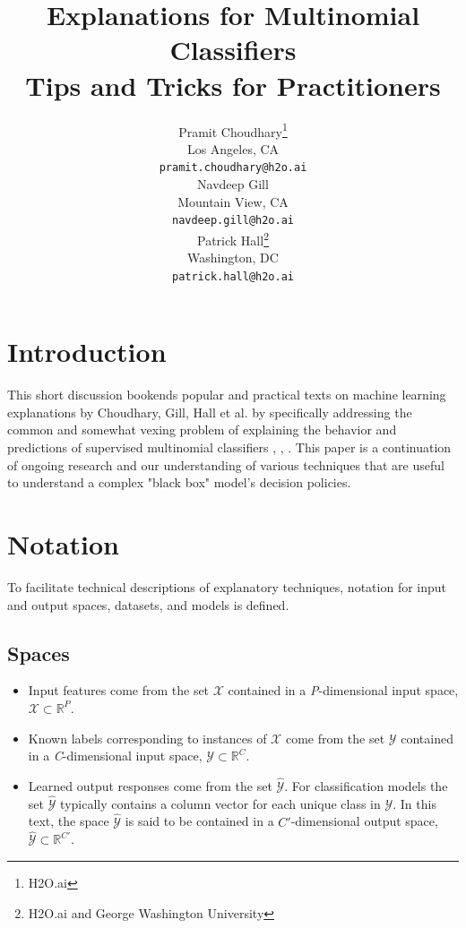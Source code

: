 \documentclass{article}
\title{Explanations for Multinomial Classifiers\\\vspace{10pt}\small{Tips and Tricks for Practitioners}}
\author{
  Pramit Choudhary\thanks{H2O.ai}\\
  Los Angeles, CA\\
  \texttt{pramit.choudhary@h2o.ai}\\
  \And
  Navdeep Gill\samethanks\\
  Mountain View, CA\\
  \texttt{navdeep.gill@h2o.ai}\\ 
  \And
  Patrick Hall\thanks{H2O.ai and George Washington University}\\
  Washington, DC\\
  \texttt{patrick.hall@h2o.ai}}
\begin{document}
\maketitle

\begin{abstract}


\end{abstract}

\section{Introduction}

This short discussion bookends popular and practical texts on machine learning explanations by Choudhary, Gill, Hall et al. by specifically addressing the common and somewhat vexing problem of explaining the behavior and predictions of supervised multinomial classifiers \cite{oreillymli}, \cite{art_and_sci}, \cite{oreillyskater} \cite{sarkar2018practical}. This paper is a continuation of ongoing research and our understanding of various techniques that are useful to understand a complex "black box" model's decision policies.


\section{Notation} \label{sec:notation}

To facilitate technical descriptions of explanatory techniques, notation for input and output spaces, datasets, and models is defined.

\subsection{Spaces} 
 
	\begin{itemize}
		\item Input features come from the set $\mathcal{X}$ contained in a \textit{P}-dimensional input space,\\ $\mathcal{X} \subset \mathbb{R}^P$.  
		\item Known labels corresponding to instances of $\mathcal{X}$ come from the set $\mathcal{Y}$ contained in a \textit{C}-dimensional input space, $\mathcal{Y} \subset \mathbb{R}^C$.
		\item Learned output responses come from the set $\hat{\mathcal{Y}}$. For classification models the set $\hat{\mathcal{Y}}$ typically contains a column vector for each unique class in $\mathcal{Y}$. In this text, the space $\hat{\mathcal{Y}}$ is said to be contained in a $C'$-dimensional output space,  $\hat{\mathcal{Y}} \subset \mathbb{R}^{C'}$. 
	\end{itemize}	
	
\end{document}

